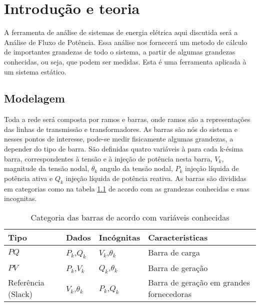 \chapter{Introdu\c{c}\~ao e teoria}





A ferramenta de an\'alise de sistemas de energia el\'etrica aqui discutida ser\'a a An\'alise de Fluxo de Pot\^encia. Essa an\'alise nos fornecer\'a um metodo de cálculo de importantes grandezas de todo o sistema, a partir de algumas grandezas conhecidas, ou seja, que podem ser medidas. Esta \'e uma ferramenta aplicada \`a um sistema est\'atico. \cite{monticelli}
\section{Modelagem}
\label{SectionIntro}
Toda a rede ser\'a composta por ramos e barras, onde ramos s\~ao a representa\c{c}\~oes das linhas de transmiss\~ao e transformadores. As barras s\~ao n\'os do sistema e nesses pontos de interesse, pode-se medir fisicamente algumas grandezas, a depender do tipo de barra. S\~ao definidas quatro vari\'aveis \`a para cada k-ésima barra, correspondentes \`a tens\~ao e \`a inje\c{c}\~ao de
pot\^encia nesta barra, $V_k$, magnitude da tens\~ao nodal, $\theta_k$ angulo da tens\~ao nodal, $P_k$ inje\c{c}\~ao l\'iquida de pot\^encia ativa e $Q_k$ inje\c{c}\~ao l\'iquida de pot\^encia reativa. As barras s\~ao divididas em categorias como na tabela \ref{t_PQPVSlack} de acordo com as grandezas conhecidas e suas incognitas.
\begin{table}[]
\caption{Categoria das barras de acordo com variáveis conhecidas}
\begin{tabular}{@{}llll@{}}
\toprule
Tipo & Dados & Incógnitas & Caracteristicas \\ 
\midrule
$PQ$ & $P_k$,$Q_k$ & $V_k$,$\theta_k$  & Barra de carga \\
$PV$ & $P_k$,$V_k$ & $Q_k$,$\theta_k$  & Barra de geração\\
Referência (Slack) & $V_k$,$\theta_k$ & $P_k$,$Q_k$& Barra de geração em grandes fornecedoras \\ \bottomrule
\end{tabular}
\label{t_PQPVSlack}
\end{table}



